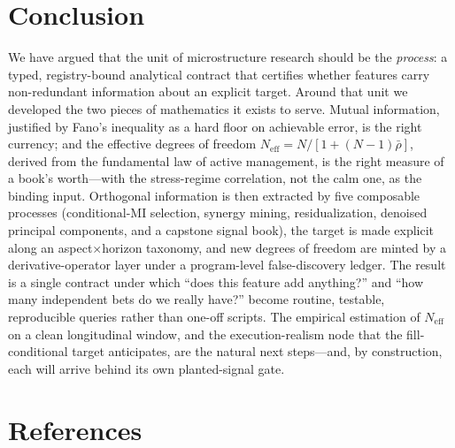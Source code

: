 \documentclass[11pt,a4paper]{article}
\theoremstyle{definition}
\theoremstyle{plain}
\newcommand{\Neff}{N_{\mathrm{eff}}}
\newcommand{\rhobar}{\bar{\rho}}
\begin{document}
\section{Conclusion}
\label{sec:conclusion}

We have argued that the unit of microstructure research should be the \emph{process}: a typed,
registry-bound analytical contract that certifies whether features carry non-redundant information
about an explicit target. Around that unit we developed the two pieces of mathematics it exists to
serve. Mutual information, justified by Fano's inequality as a hard floor on achievable error, is
the right currency; and the effective degrees of freedom $\Neff=N/[1+(N-1)\rhobar]$, derived from
the fundamental law of active management, is the right measure of a book's worth---with the
stress-regime correlation, not the calm one, as the binding input. Orthogonal information is then
extracted by five composable processes (conditional-MI selection, synergy mining, residualization,
denoised principal components, and a capstone signal book), the target is made explicit along an
aspect$\times$horizon taxonomy, and new degrees of freedom are minted by a derivative-operator layer
under a program-level false-discovery ledger. The result is a single contract under which
``does this feature add anything?'' and ``how many independent bets do we really have?'' become
routine, testable, reproducible queries rather than one-off scripts. The empirical estimation of
$\Neff$ on a clean longitudinal window, and the execution-realism node that the fill-conditional
target anticipates, are the natural next steps---and, by construction, each will arrive behind its
own planted-signal gate.

\section*{References}
\end{document}
